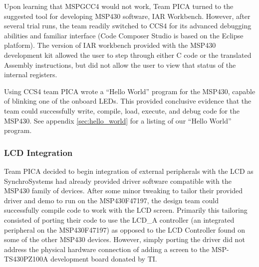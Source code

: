 Upon learning that MSPGCC4 would not work, Team PICA turned to the suggested tool for developing MSP430 software, IAR Workbench. However, after several trial runs, the team readily switched to \ac{CCS4} for its advanced debugging abilities and familiar interface (Code Composer Studio is based on the Eclipse platform). The version of IAR workbench provided with the MSP430 development kit allowed the user to step through either C code or the translated Assembly instructions, but did not allow the user to view that status of the internal registers.

Using \ac{CCS4} team PICA wrote a ``Hello World'' program for the MSP430, capable of blinking one of the onboard \acp{LED}. This provided conclusive evidence that the team could successfully write, compile, load, execute, and debug code for the MSP430. See appendix \ref{sec:hello_world} for a listing of our ``Hello World'' program.

\subsubsection{LCD Integration}
Team PICA decided to begin integration of external peripherals with the \ac{LCD} as SynchroSystems had already provided driver software compatible with the MSP430 family of devices. After some minor tweaking to tailor their provided driver and demo to run on the MSP430F47197, the design team could successfully compile code to work with the \ac{LCD} screen. Primarily this tailoring consisted of porting their code to use the LCD\_A controller (an integrated peripheral on the MSP430F47197) as opposed to the \ac{LCD} Controller found on some of the other MSP430 devices. However, simply porting the driver did not address the physical hardware connection of adding a screen to the MSP-TS430PZ100A development board donated by \ac{TI}.

